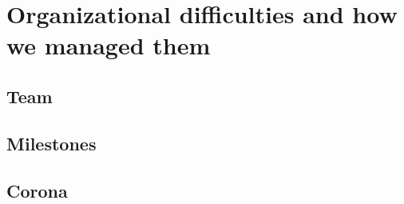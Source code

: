 \documentclass[main.tex]{subfiles}
\begin{document}
	\begingroup

	\renewcommand{\cleardoublepage}{}

	\renewcommand{\clearpage}{}

	\chapter{Organizational difficulties and how we managed them}

		\chapterauthor{}
		
		\section{Team}
		
		
		\section{Milestones}
		
		\section{Corona}
	  	

	\endgroup
\end{document}
